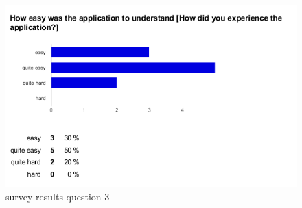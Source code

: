 \begin{figure}[b!]
\begin{minipage}{0.50\textwidth}
        \includegraphics[width=1.80\textwidth]{00_resources/figures/survey_results1.png}
    \end{minipage}
  \caption{survey results question 3}
  \label{fig:smwui}
\end{figure}

